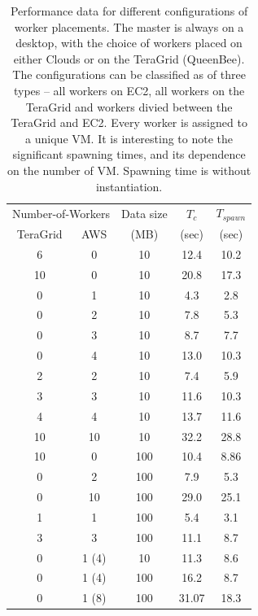 \documentclass[conference,final]{IEEEtran}
\newcommand{\upp}{\vspace*{-0.5em}}
\begin{document}
\begin{table}
\upp
\begin{tabular}{ccccc}
  \hline
  \multicolumn{2}{c}{Number-of-Workers}  &  Data size   &  $T_c$  & $T_{spawn}$ \\   
  TeraGrid &  AWS &   (MB)  & (sec) & (sec)  \\
  \hline
  6 & 0 & 10  &  12.4 &  10.2 \\
  10 & 0 & 10  & 20.8 & 17.3 \\  
  \hline 
  0 & 1 & 10 & 4.3 & 2.8 \\
  0 & 2 & 10 & 7.8 & 5.3 \\ 
  0 & 3 & 10 & 8.7 & 7.7 \\
  0 & 4 & 10 & 13.0 & 10.3 \\
  \hline 
  2 & 2 & 10 & 7.4 & 5.9 \\
  3 & 3 & 10 & 11.6 & 10.3 \\
  4 & 4 & 10 & 13.7 & 11.6 \\
  10 & 10 & 10 & 32.2 & 28.8 \\
  \hline
  \hline 
  10 & 0 & 100 & 10.4 & 8.86 \\
  0 & 2 & 100 & 7.9 & 5.3 \\
  0 & 10 & 100 &  29.0 & 25.1 \\
  1 & 1 & 100 & 5.4 & 3.1 \\
  3 & 3 & 100 & 11.1 & 8.7 \\
  \hline \hline
  0 & 1 (4) & 10 &  11.3 & 8.6 \\
  0 & 1 (4) & 100 & 16.2 & 8.7 \\ 
  0 & 1 (8) & 100 & 31.07 & 18.3\\
  \hline \hline
\end{tabular}
\upp
\caption{Performance data for different configurations of worker placements. The master is always on a desktop, with the choice of workers placed on either Clouds or on the TeraGrid (QueenBee). The configurations can be classified as of three types -- all workers on EC2, all workers on the TeraGrid and workers divied between the TeraGrid and EC2. Every worker is assigned to a unique  VM. It is interesting to note the significant spawning times, and its dependence on the number of VM. Spawning time is without instantiation.}
\label{stuff}
\upp
\upp
\end{table}
\end{document}
